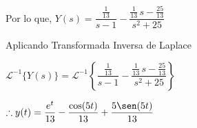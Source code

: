 \documentclass[fleqn]{article}
\begin{document}
    Por lo que, $ Y(s) = \dfrac{\frac{1}{13}}{s - 1} - \dfrac{\frac{1}{13} \, s - \frac{25}{13}}{s^2 + 25} $

    Aplicando Transformada Inversa de Laplace

    $ \mathscr{L}^{-1} \lbrace Y(s) \rbrace = \mathscr{L}^{-1} \left\lbrace \dfrac{\frac{1}{13}}{s - 1} - \dfrac{\frac{1}{13} \, s - \frac{25}{13}}{s^2 + 25} \right\rbrace $ 

    $ \therefore y(t) = \dfrac{e^t}{13} - \dfrac{\cos (5t)}{13}  + \dfrac{5 \sen (5t)}{13} $
\end{document}
